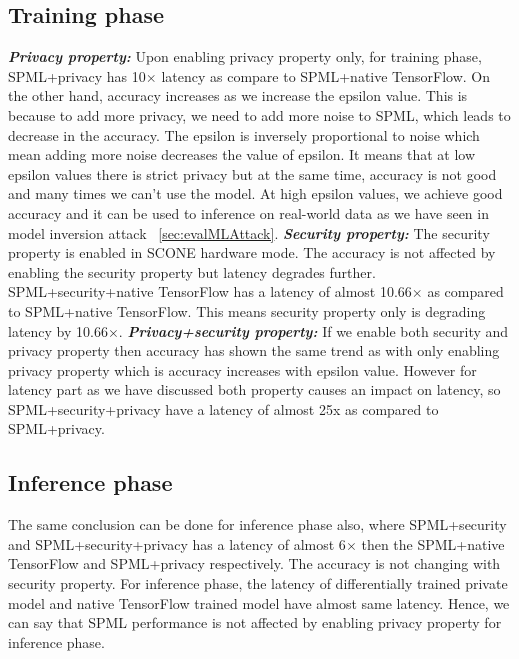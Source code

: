 \subsection{Training phase}
\textbf{\textit{Privacy property: }}Upon enabling privacy property only, for training phase, SPML+privacy has 10$\times$ latency as compare to SPML+native TensorFlow. On the other hand, accuracy increases as we increase the epsilon value. This is because to add more privacy, we need to add more noise to SPML, which leads to decrease in the accuracy. The epsilon is inversely proportional to noise which mean adding more noise decreases the value of epsilon. It means that at low epsilon values there is strict privacy but at the same time, accuracy is not good and many times we can't use the model. At high epsilon values, we achieve good accuracy and it can be used to inference on real-world data as we have seen in model inversion attack ~\ref{sec:evalMLAttack}. 
\newline
\newline
\textbf{\textit{Security property: }}
The security property is enabled in SCONE hardware mode. The accuracy is not affected by enabling the security property but latency degrades further. SPML+security+native TensorFlow has a latency of almost 10.66$\times$ as compared to SPML+native TensorFlow. This means security property only is degrading latency by 10.66$\times$.
\newline
\newline
\textbf{\textit{Privacy+security property: }}If we enable both security and privacy property then accuracy has shown the same trend as with only enabling privacy property which is accuracy increases with epsilon value. However for latency part as we have discussed both property causes an impact on latency, so SPML+security+privacy have a latency of almost 25x as compared to SPML+privacy. 
\subsection{Inference phase}
The same conclusion can be done for inference phase also, where SPML+security and SPML+security+privacy has a latency of almost 6$\times$ then the SPML+native TensorFlow and SPML+privacy respectively. The accuracy is not changing with security property. For inference phase, the latency of differentially trained private model and native TensorFlow trained model have almost same latency. Hence, we can say that SPML performance is not affected by enabling privacy property for inference phase. 

